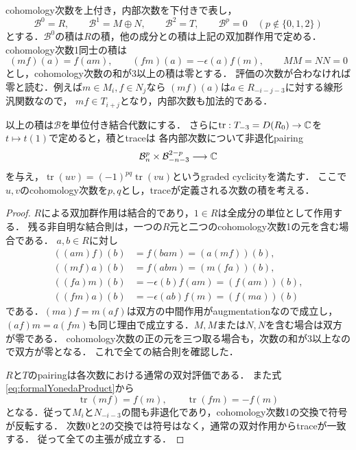\documentclass[11pt,a4paper]{ltjsarticle}
\begin{document}
cohomology次数を上付き，内部次数を下付きで表し，
\[
 \mathcal B^0=R,\qquad \mathcal B^1=M\oplus N,\qquad
 \mathcal B^2=T,\qquad \mathcal B^p=0\quad(p\notin\{0,1,2\})
\]
とする．$\mathcal B^0$の積は$R$の積，他の成分との積は上記の双加群作用で定める．
cohomology次数1同士の積は
\begin{equation}\label{eq:formalYonedaProduct}
 (m f)(a)=f(a m),\qquad
 (f m)(a)=-\epsilon(a)f(m),\qquad M M=N N=0
\end{equation}
とし，cohomology次数の和が3以上の積は零とする．
評価の次数が合わなければ零と読む．例えば$m\in M_i,f\in N_j$なら
$(mf)(a)$は$a\in R_{-i-j-3}$に対する線形汎関数なので，
$mf\in T_{i+j}$となり，内部次数も加法的である．

\begin{proposition}\label{prop:formalYoneda}
以上の積は$\mathcal B$を単位付き結合代数にする．
さらに$\operatorname{tr}:T_{-3}=D(R_0)\to\mathbb C$を$t\mapsto t(1)$で定めると，積とtraceは
各内部次数について非退化pairing
\[
 \mathcal B^p_n\times\mathcal B^{2-p}_{-n-3}\longrightarrow\mathbb C
\]
を与え，$\operatorname{tr}(uv)=(-1)^{pq}\operatorname{tr}(vu)$というgraded cyclicityを満たす．
ここで$u,v$のcohomology次数を$p,q$とし，traceが定義される次数の積を考える．
\end{proposition}
\begin{proof}
$R$による双加群作用は結合的であり，$1\in R$は全成分の単位として作用する．
残る非自明な結合則は，一つの$R$元と二つのcohomology次数1の元を含む場合である．
$a,b\in R$に対し
\begin{align*}
 ((a m)f)(b)&=f(b a m)=(a(mf))(b),\\
 ((m f)a)(b)&=f(a b m)=(m(fa))(b),\\
 ((f a)m)(b)&=-\epsilon(b)f(a m)=(f(am))(b),\\
 ((f m)a)(b)&=-\epsilon(ab)f(m)=(f(ma))(b)
\end{align*}
である．$(ma)f=m(af)$は双方の中間作用がaugmentationなので成立し，
$(af)m=a(fm)$も同じ理由で成立する．$M,M$または$N,N$を含む場合は双方が零である．
cohomology次数の正の元を三つ取る場合も，次数の和が3以上なので双方が零となる．
これで全ての結合則を確認した．

$R$と$T$のpairingは各次数における通常の双対評価である．
また式\eqref{eq:formalYonedaProduct}から
\[
 \operatorname{tr}(mf)=f(m),\qquad
 \operatorname{tr}(fm)=-f(m)
\]
となる．従って$M_i$と$N_{-i-3}$の間も非退化であり，cohomology次数1の交換で符号が反転する．
次数0と2の交換では符号はなく，通常の双対作用からtraceが一致する．
従って全ての主張が成立する．
\end{proof}
\end{document}
